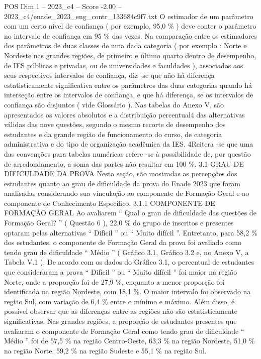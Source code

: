 \begin{textsample}{POS Dim 1 – 2023\_c4 – Score -2.00 – 2023\_c4/enade\_2023\_eng\_contr\_133684c9f7.txt}
O estimador de um parâmetro com um certo nível de confiança ( por exemplo, 95,0 \% ) deve conter o parâmetro no intervalo de confiança em 95 \% das vezes.
Na comparação entre os estimadores dos parâmetros de duas classes de uma dada categoria ( por exemplo : Norte e Nordeste nas grandes regiões, de primeiro e último quarto dentro de desempenho, de IES públicas e privadas, ou de universidades e faculdades ), associados aos seus respectivos intervalos de confiança, diz -se que não há diferença estatisticamente significativa entre os parâmetros das duas categorias quando há interseção entre os intervalos de confiança, e que há diferença, se os intervalos de confiança são disjuntos ( vide Glossário ).
Nas tabelas do Anexo V, são apresentados os valores absolutos e a distribuição percentual4 das alternativas válidas das nove questões, segundo o mesmo recorte de desempenho dos estudantes e da grande região de funcionamento do curso, de categoria administrativa e do tipo de organização acadêmica da IES. 4Reitera -se que uma das convenções para tabelas numéricas refere -se à possibilidade de, por questão de arredondamento, a soma das partes não resultar em 100 \%. 3.1 GRAU DE DIFICULDADE DA PROVA Nesta seção, são mostradas as percepções dos estudantes quanto ao grau de dificuldade da prova do Enade 2023 que foram analisadas considerando sua vinculação ao componente de Formação Geral e ao componente de Conhecimento Específico. 3.1.1 COMPONENTE DE FORMAÇÃO GERAL Ao avaliarem “ Qual o grau de dificuldade das questões de Formação Geral? ” ( Questão 6 ), 22,0 \% do grupo de inscritos e presentes optaram pelas alternativas “ Difícil ” ou “ Muito difícil ”.
Entretanto, para 58,2 \% dos estudantes, o componente de Formação Geral da prova foi avaliado como tendo grau de dificuldade “ Médio ” ( Gráfico 3.1, Gráfico 3.2 e, no Anexo V, a Tabela V.1 ).
De acordo com os dados do Gráfico 3.1, o percentual de estudantes que consideraram a prova “ Difícil ” ou “ Muito difícil ” foi maior na região Norte, onde a proporção foi de 27,9 \%, enquanto a menor proporção foi identificada na região Nordeste, com 18,1 \%.
O maior intervalo foi observado na região Sul, com variação de 6,4 \% entre o mínimo e máximo.
Além disso, é possível observar que as diferenças entre as regiões não são estatisticamente significativas.
Nas grandes regiões, a proporção de estudantes presentes que avaliaram o componente de Formação Geral como tendo grau de dificuldade “ Médio ” foi de 57,5 \% na região Centro-Oeste, 63,3 \% na região Nordeste, 51,0 \% na região Norte, 59,2 \% na região Sudeste e 55,1 \% na região Sul.

\end{textsample}
